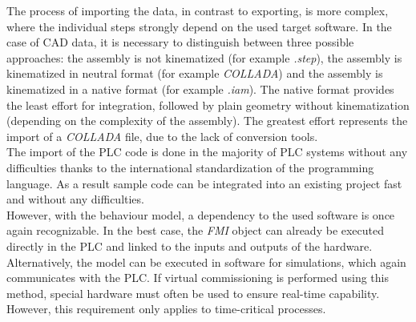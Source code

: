     The process of importing the data, in contrast to exporting, is more complex, where the individual steps strongly depend on the used target software. In the case of CAD data, it is necessary to distinguish between three possible approaches: the assembly is not kinematized (for example \textit{.step}), the assembly is kinematized in neutral format (for example \textit{COLLADA}) and the assembly is kinematized in a native format (for example \textit{.iam}). The native format provides the least effort for integration, followed by plain geometry without kinematization (depending on the complexity of the assembly). The greatest effort represents the import of a \textit{COLLADA} file, due to the lack of conversion tools. \\
    The import of the PLC code is done in the majority of PLC systems without any difficulties thanks to the international standardization of the programming language. As a result sample code can be integrated into an existing project fast and without any difficulties. \\
    However, with the behaviour model, a dependency to the used software is once again recognizable. In the best case, the \textit{FMI} object can already be executed directly in the PLC and linked to the inputs and outputs of the hardware. Alternatively, the model can be executed in software for simulations, which again communicates with the PLC. If virtual commissioning is performed using this method, special hardware must often be used to ensure real-time capability. However, this requirement only applies to time-critical processes.

